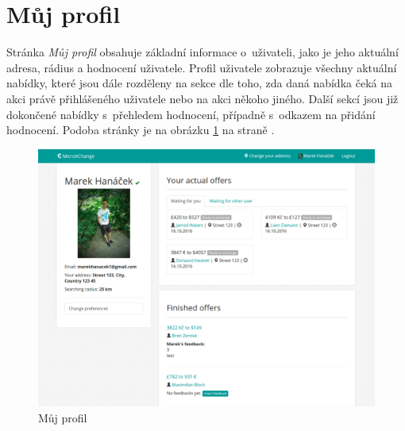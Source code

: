 \section{Můj profil}
\label{nur:my-profile}

Stránka \textit{Můj profil} obsahuje základní informace o~uživateli, jako je jeho aktuální adresa, rádius a hodnocení uživatele.
Profil uživatele zobrazuje všechny aktuální nabídky, které jsou dále rozděleny na sekce dle toho, zda daná nabídka čeká na akci právě přihlášeného uživatele nebo na akci někoho jiného. Další sekcí jsou již dokončené nabídky s~přehledem hodnocení, případně s~odkazem na přidání hodnocení. Podoba stránky je na obrázku \ref{fig:tur:my-profile} na straně \pageref{fig:tur:my-profile}.

\begin{figure}[!h]
    \centering
    \includegraphics[width=1.0\textwidth]{media/tur/my-profile.png}
    \caption{Můj profil}
    \label{fig:tur:my-profile}
\end{figure}